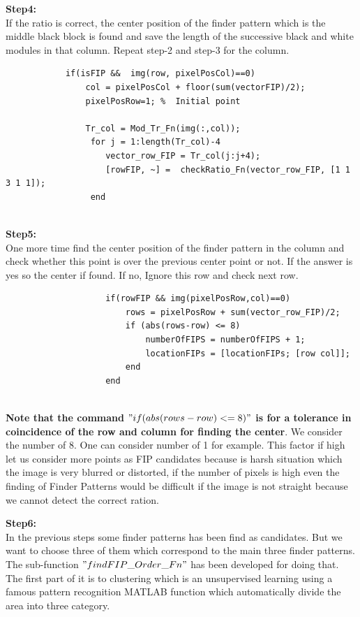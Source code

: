 \textbf{Step4:}\\ If the ratio is correct, the center position of the finder pattern which is the middle black block is found and save the length of the successive black and white modules in that column. Repeat step-2 and step-3 for the column.

\begin{lstlisting}
            if(isFIP &&  img(row, pixelPosCol)==0)
                col = pixelPosCol + floor(sum(vectorFIP)/2);
                pixelPosRow=1; %  Initial point
              
                Tr_col = Mod_Tr_Fn(img(:,col));
                 for j = 1:length(Tr_col)-4
                    vector_row_FIP = Tr_col(j:j+4);
                    [rowFIP, ~] =  checkRatio_Fn(vector_row_FIP, [1 1 3 1 1]);
                 end
                    
\end{lstlisting}




\textbf{Step5:}\\ One more time find the center position of the finder pattern in the column and check whether this point is over the previous center point or not. If the answer is yes so the center if found. If no, Ignore this row and check next row. 

\begin{lstlisting}
                    if(rowFIP && img(pixelPosRow,col)==0)
                        rows = pixelPosRow + sum(vector_row_FIP)/2;
                        if (abs(rows-row) <= 8) 
                            numberOfFIPS = numberOfFIPS + 1;
                            locationFIPs = [locationFIPs; [row col]];
                        end
                    end 
                    
\end{lstlisting}

\textbf{Note that the command $"if (abs(rows-row) <= 8)"$ is for a tolerance in coincidence of the row and column for finding the center}. We consider the number of 8. One can consider number of 1 for example. This factor if high let us consider more points as FIP candidates because is harsh situation which the image is very blurred or distorted, if the number of pixels is high even the finding of Finder Patterns would be difficult if the image is not straight because we cannot detect the correct ration.

\textbf{Step6:}\\ In the previous steps some finder patterns has been find as candidates. But we want to choose three of them which correspond to the main three finder patterns. The sub-function $"findFIP\_Order\_Fn"$ has been developed for doing that. The first part of it is to clustering which is an unsupervised learning using a famous pattern recognition MATLAB function which automatically divide the area into three category.

